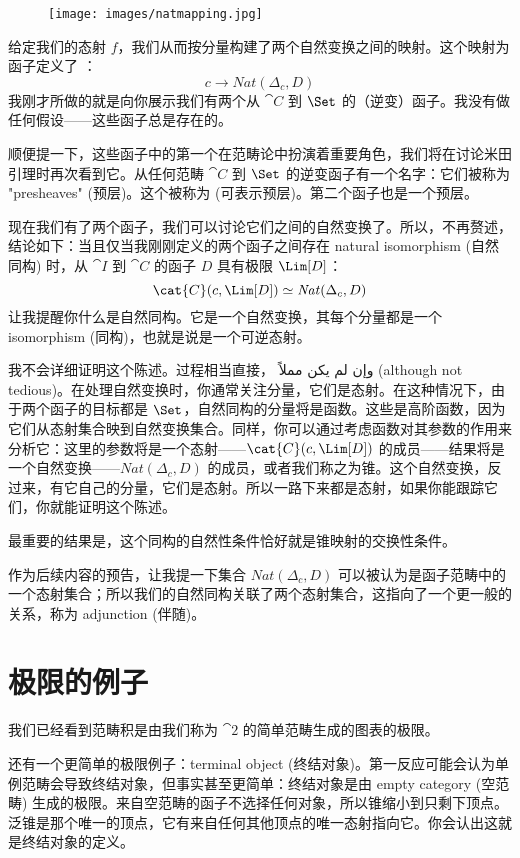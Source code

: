 \begin{figure}[H]
  \centering
  \texttt{[image: images/natmapping.jpg]}
\end{figure}

\noindent
给定我们的态射 $f$，我们从而按分量构建了两个自然变换之间的映射。这个映射为函子定义了 ：
\[c \to \mathit{Nat}(\Delta_c, D)\]
我刚才所做的就是向你展示我们有两个从 $\cat{C}$ 到 $\Set$ 的（逆变）函子。我没有做任何假设——这些函子总是存在的。

顺便提一下，这些函子中的第一个在范畴论中扮演着重要角色，我们将在讨论米田引理时再次看到它。从任何范畴 $\cat{C}$ 到 $\Set$ 的逆变函子有一个名字：它们被称为 "presheaves" (预层)。这个被称为  (可表示预层)。第二个函子也是一个预层。

现在我们有了两个函子，我们可以讨论它们之间的自然变换了。所以，不再赘述，结论如下：当且仅当我刚刚定义的两个函子之间存在 natural isomorphism (自然同构) 时，从 $\cat{I}$ 到 $\cat{C}$ 的函子 $D$ 具有极限 $\Lim[D]$：
\[\cat{C}(c, \Lim[D]) \simeq \mathit{Nat}(\Delta_c, D)\]
让我提醒你什么是自然同构。它是一个自然变换，其每个分量都是一个 isomorphism (同构)，也就是说是一个可逆态射。

我不会详细证明这个陈述。过程相当直接， وإن لم يكن مملاً (although not tedious)。在处理自然变换时，你通常关注分量，它们是态射。在这种情况下，由于两个函子的目标都是 $\Set$，自然同构的分量将是函数。这些是高阶函数，因为它们从态射集合映到自然变换集合。同样，你可以通过考虑函数对其参数的作用来分析它：这里的参数将是一个态射——$\cat{C}(c, \Lim[D])$ 的成员——结果将是一个自然变换——$\mathit{Nat}(\Delta_c, D)$ 的成员，或者我们称之为锥。这个自然变换，反过来，有它自己的分量，它们是态射。所以一路下来都是态射，如果你能跟踪它们，你就能证明这个陈述。

最重要的结果是，这个同构的自然性条件恰好就是锥映射的交换性条件。

作为后续内容的预告，让我提一下集合 $\mathit{Nat}(\Delta_c, D)$ 可以被认为是函子范畴中的一个态射集合；所以我们的自然同构关联了两个态射集合，这指向了一个更一般的关系，称为 adjunction (伴随)。

\section{极限的例子}

我们已经看到范畴积是由我们称为 $\cat{2}$ 的简单范畴生成的图表的极限。

还有一个更简单的极限例子：terminal object (终结对象)。第一反应可能会认为单例范畴会导致终结对象，但事实甚至更简单：终结对象是由 empty category (空范畴) 生成的极限。来自空范畴的函子不选择任何对象，所以锥缩小到只剩下顶点。泛锥是那个唯一的顶点，它有来自任何其他顶点的唯一态射指向它。你会认出这就是终结对象的定义。

